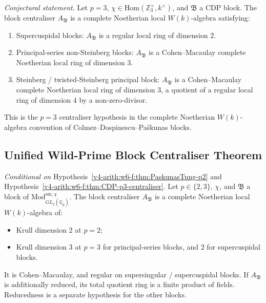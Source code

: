 \begin{hypothesis}[\(p=3\) wild block-centraliser datum]
\label{v4-arith:w6-f:thm:CDP-p3-centraliser}
\emph{Conjectural statement.} Let \(p=3\), \(\chi\in\mathrm{Hom}(\mathbb{Z}_{3}^{\times},k^{\times})\),
and \(\mathfrak{B}\) a CDP block. The block centraliser
\(A_{\mathfrak{B}}\) is a complete Noetherian local \(W(k)\)-algebra
satisfying:
\begin{enumerate}
\item Supercuspidal blocks: \(A_{\mathfrak{B}}\) is a regular local
ring of dimension \(2\).
\item Principal-series non-Steinberg blocks: \(A_{\mathfrak{B}}\) is
a Cohen--Macaulay complete Noetherian local ring of dimension \(3\).
\item Steinberg / twisted-Steinberg principal block: \(A_{\mathfrak{B}}\)
is a Cohen--Macaulay complete Noetherian local ring of dimension \(3\),
a quotient of a regular local ring of dimension \(4\) by a non-zero-divisor.
\end{enumerate}
\end{hypothesis}

\begin{remark}
This is the \(p=3\) centraliser hypothesis in the complete Noetherian
\(W(k)\)-algebra convention of Colmez--Dospinescu--Pa\v skunas blocks.
\end{remark}

\subsection{Unified Wild-Prime Block Centraliser Theorem}

\begin{theorem}
\label{v4-arith:w6-f:thm:R-B-2-unified}
\emph{Conditional on}
Hypothesis~\ref{v4-arith:w6-f:thm:PaskunasTung-p2} and
Hypothesis~\ref{v4-arith:w6-f:thm:CDP-p3-centraliser}. Let \(p\in\{2,3\}\),
\(\chi\), and \(\mathfrak{B}\)
a block of \(\mathrm{Mod}^{\mathrm{sm},\chi}_{GL_{2}(\mathbb{Q}_{p})}\).
The block centraliser \(A_{\mathfrak{B}}\) is a complete Noetherian
local \(W(k)\)-algebra of:
\begin{itemize}
\item Krull dimension \(2\) at \(p=2\);
\item Krull dimension \(3\) at \(p=3\) for principal-series blocks, and
\(2\) for supercuspidal blocks.
\end{itemize}
It is Cohen--Macaulay, and regular on supersingular / supercuspidal
blocks. If \(A_{\mathfrak B}\) is additionally reduced, its
total quotient ring is a finite product of fields. Reducedness is
a separate hypothesis for the other blocks.
\end{theorem}

